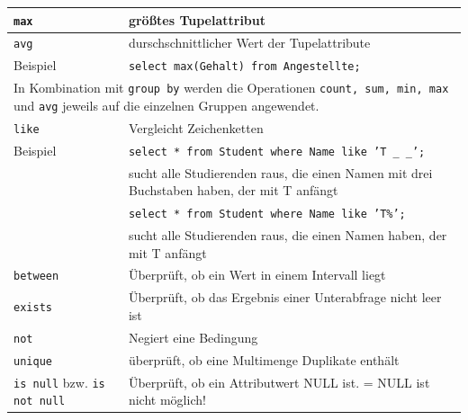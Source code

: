 \documentclass{article}
\begin{document}
\begin{center}
\begin{longtable}{|p{4cm}|p{7cm}|}
    \hline
    \texttt{max} & größtes Tupelattribut \\
    \hline
    \texttt{avg} & durschschnittlicher Wert der Tupelattribute \\
    \hline
    Beispiel & \texttt{select max(Gehalt) from Angestellte;} \\
    \hline
    \multicolumn{2}{|p{11cm}|}{In Kombination mit \texttt{group by} werden die Operationen \texttt{count, sum, min, max} und \texttt{avg} jeweils auf die einzelnen Gruppen angewendet.} \\
    \hline
    \texttt{like} & Vergleicht Zeichenketten \\
    \hline
    Beispiel & \texttt{select * from Student where Name like 'T \_ \_';} \\
    & sucht alle Studierenden raus, die einen Namen mit drei Buchstaben haben, der mit T anfängt\\
    & \texttt{select * from Student where Name like 'T\%';} \\
    & sucht alle Studierenden raus, die einen Namen haben, der mit T anfängt \\
    \hline
    \texttt{between} & Überprüft, ob ein Wert in einem Intervall liegt \\
    \hline
    \texttt{exists} & Überprüft, ob das Ergebnis einer Unterabfrage nicht leer ist \\
    \hline
    \texttt{not} & Negiert eine Bedingung \\
    \hline
    \texttt{unique} & überprüft, ob eine Multimenge Duplikate enthält \\
    \hline
    \texttt{is null} bzw. \texttt{is not null} & Überprüft, ob ein Attributwert NULL ist. = NULL ist nicht möglich! \\
    \hline
  \end{longtable}
\end{center}
\end{document}
